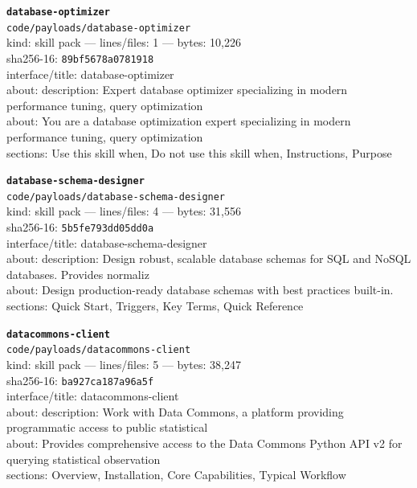 \noindent\textbf{\texttt{database-optimizer}}\\
\texttt{code/payloads/database-optimizer}\\
kind: skill pack --- lines/files: 1 --- bytes: 10,226\\
sha256-16: \texttt{89bf5678a0781918}\\
interface/title: database-optimizer\\
about: description: Expert database optimizer specializing in modern performance tuning, query optimization\\
about: You are a database optimization expert specializing in modern performance tuning, query optimization\\
sections: Use this skill when, Do not use this skill when, Instructions, Purpose\\
\vspace*{6.0pt}
\newpage

\noindent\textbf{\texttt{database-schema-designer}}\\
\texttt{code/payloads/database-schema-designer}\\
kind: skill pack --- lines/files: 4 --- bytes: 31,556\\
sha256-16: \texttt{5b5fe793dd05dd0a}\\
interface/title: database-schema-designer\\
about: description: Design robust, scalable database schemas for SQL and NoSQL databases. Provides normaliz\\
about: Design production-ready database schemas with best practices built-in.\\
sections: Quick Start, Triggers, Key Terms, Quick Reference\\
\vspace*{6.0pt}

\noindent\textbf{\texttt{datacommons-client}}\\
\texttt{code/payloads/datacommons-client}\\
kind: skill pack --- lines/files: 5 --- bytes: 38,247\\
sha256-16: \texttt{ba927ca187a96a5f}\\
interface/title: datacommons-client\\
about: description: Work with Data Commons, a platform providing programmatic access to public statistical \\
about: Provides comprehensive access to the Data Commons Python API v2 for querying statistical observation\\
sections: Overview, Installation, Core Capabilities, Typical Workflow\\
\vspace*{6.0pt}

